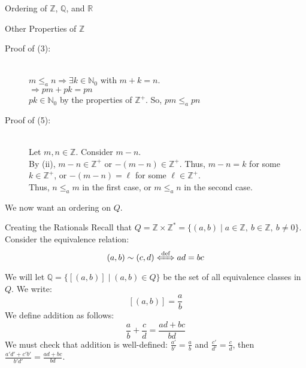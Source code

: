 \documentclass[8pt]{extarticle}
\newcommand{\N}{\mathbb{N}}
\newcommand{\Q}{\mathbb{Q}}
\newcommand{\Z}{\mathbb{Z}}
\newcommand{\R}{\mathbb{R}}
\begin{document}
\begin{problem}{Ordering of $\Z$, $\Q$, and $\R$}
\begin{problem}{Other Properties of $\Z$}
\begin{enumerate}[(\arabic*)]
      \end{enumerate}
      \tcblower
      \begin{description}
        \item[Proof of (3):]\hfill\\
          $m\leq_a n \Rightarrow \exists k\in \N_0$ with $m+k = n$.\\
          $\Rightarrow pm + pk = pn$\\
          $pk\in \N_0$ by the properties of $\Z^+$. So, $pm \leq_a pn$
        \item[Proof of (5):]\hfill\\
          Let $m,n\in\Z$. Consider $m-n$.\\
          By (ii), $m-n\in\Z^+$ or $-(m-n)\in\Z^+$. Thus, $m-n = k$ for some $k\in\Z^+$, or $-(m-n) = \ell$ for some $\ell\in\Z^+$.\\
          Thus, $n\leq_a m$ in the first case, or $m\leq_a n$ in the second case.
      \end{description}
    \end{problem}
    We now want an ordering on $Q$.
    \begin{problem}{Creating the Rationals}
      Recall that $Q = \Z \times \Z^* = \{(a,b) \mid a\in \Z,~b\in \Z,~b\neq 0\}$. Consider the equivalence relation:
      \[
        (a,b)\sim(c,d) \xLeftrightarrow{\text{def}} ad = bc
      \] 
      We will let $\Q = \{[(a,b)]\mid (a,b) \in Q\}$ be the set of all equivalence classes in $Q$. We write:
      \[
        [(a,b)] = \frac{a}{b}
      \] 
      We define addition as follows:
      \[
        \frac{a}{b} + \frac{c}{d} = \frac{ad + bc}{bd}
      \] 
      We must check that addition is well-defined: $\frac{a'}{b'} = \frac{a}{b}$ and $\frac{c'}{d'} = \frac{c}{d}$, then $\frac{a'd' + c'b'}{b'd'} = \frac{ad+bc}{bd}$.\\


\end{problem}
\end{problem}
\end{document}
